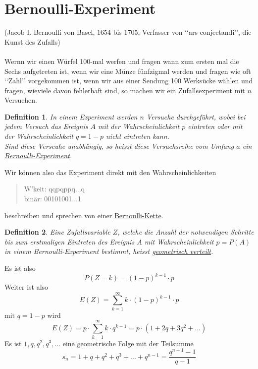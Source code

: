 \documentclass{report}
\newtheorem{mydef}{Definition}
\begin{document}
\section{Bernoulli-Experiment}
(Jacob I. Bernoulli von Basel, 1654 bis 1705, Verfasser von \lq\lq{}ars conjectandi\rq\rq{}, die Kunst des Zufalls)\\\\
Wernn wir einen Würfel 100-mal werfen und fragen wann zum ersten mal die Sechs aufgetreten ist, wenn wir eine Münze fünfzigmal werden und fragen wie oft \lq\lq{}Zahl\rq\rq{} vorgekommen ist, wenn wir aus einer Sendung 100 Werksücke wählen und fragen, wieviele davon fehlerhaft sind, so machen wir ein Zufallsexperiment mit $n$ Versuchen.
\begin{mydef}
In einem Experiment werden $n$ Versuche durchgeführt, wobei bei jedem Versuch das Ereignis $A$ mit der Wahrscheinlichkeit $p$ eintreten oder mit der Wahrscheinlichkeit $q = 1-p$ nicht eintreten kann.\\
Sind diese Verscuhe unabhängig, so heisst diese Versuchsreihe vom Umfang $a$ ein \underline{Bernoulli-Experiment}.
\end{mydef}
Wir können also das Experiment direkt mit den Wahrscheinlichkeiten
\begin{quote}
W\rq{}keit: qqpqppq...q\\
binär: 00101001...1
\end{quote}
beschreiben und sprechen von einer \underline{Bernoulli-Kette}.
\begin{mydef}
Eine Zufallsvariable $Z$, welche die Anzahl der notwendigen Schritte bis zum erstmaligen Eintreten des Ereignis $A$ mit Wahrscheinlichkeit $p = P(A)$ in einem Bernoulli-Experiment bestimmt, heisst \underline{geometrisch verteilt}.
\end{mydef}
Es ist also
\begin{equation}
P(Z=k) = (1-p)^{k-1} \cdot p
\end{equation}
Weiter ist also
\begin{equation}
E(Z) = \sum_{k=1}^{\infty}{k \cdot (1-p)^{k-1} \cdot p}
\end{equation}
mit $q = 1-p$ wird
\begin{equation}
E(Z) = p \cdot \sum_{k=1}^{\infty}{k \cdot q^{k-1}} = p \cdot (1 + 2q + 3q^2 + ...)
\end{equation}
Es ist $1, q, q^2, q^3, ...$ eine geometrische Folge mit der Teilsumme
\begin{equation}
s_n = 1 + q + q^2 + q^3 + ... + q^{n-1} = \frac{q^{n-1} - 1}{q - 1}
\end{equation}
\end{document}
